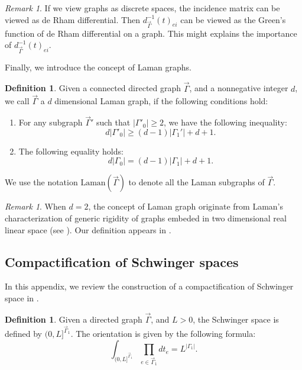 \documentclass[11pt]{amsart}
\theoremstyle{definition}
\newtheorem{defn}[thm]{Definition}
\theoremstyle{remark}
\newtheorem{rem}[thm]{Remark}
\numberwithin{equation}{section}
\begin{document}
\begin{rem}
  If we view graphs as discrete spaces, the incidence matrix can be viewed as
  de Rham differential. Then $d^{-1}_{\vec{\Gamma}}(t)_{ei}$ can be viewed as
  the Green's function of de Rham differential on a graph. This might explains
  the importance of $d^{-1}_{\vec{\Gamma}}(t)_{ei}$.
\end{rem}

Finally, we introduce the concept of Laman graphs.

\begin{defn}
  \label{Laman graph1}Given a connected directed graph $\vec{\Gamma}$, and a nonnegative integer 
  $d$, we call $\vec{\Gamma}$ a $d$ dimensional Laman graph, if the following conditions hold:
  \begin{enumerate}
    \item For any subgraph $\vec{\Gamma}'$ such that $| \Gamma'_0 | \geqslant 2$, we
    have the following inequality:
    \begin{equation}
      d | \Gamma'_0 | \geqslant (d - 1) | \Gamma_1' | + d +
      1. \label{Laman condition1}
    \end{equation}
    \item The following equality holds:
    \begin{equation}
      d | \Gamma_0 | = (d - 1) | \Gamma_1 | + d + 1.
      \label{Laman condition2}
    \end{equation}
  \end{enumerate}
  We use the notation $\mathrm{Laman} (\vec{\Gamma})$ to denote all the Laman
  subgraphs of $\vec{\Gamma}$.
\end{defn}

\begin{rem}
  When $d = 2$, the concept of Laman graph originate from Laman's
  characterization of generic rigidity of graphs embeded in two dimensional
  real linear space (see {\cite{Laman1970OnGA}}). Our definition appears in
  {\cite{budzik2023feynman}}.
\end{rem}

\subsection{Compactification of Schwinger spaces}\label{Schwinger spaces}

In this appendix, we review the construction of a compactification of
Schwinger space in {\cite{wang2024feynman,Wang:2024tjf}}.

\begin{defn}
  Given a directed graph $\vec{\Gamma}$, and $L > 0$, the {{Schwinger
  space}} is defined by $(0, L]^{\vec{\Gamma}_1 }$. The orientation is given by
  the following formula:
  \[ \int_{(0, L]^{\vec{\Gamma}_1}} \prod_{e \in \vec{\Gamma}_1} d t_e = L^{| \Gamma_1
     |} . \]
\end{defn}
\end{document}
